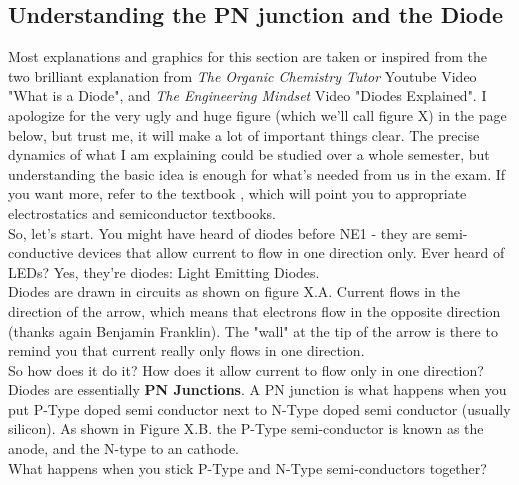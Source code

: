 \subsection{Understanding the PN junction and the Diode}

Most explanations and graphics for this section are taken or inspired from the two brilliant explanation from \emph{The Organic Chemistry Tutor} Youtube Video "What is a Diode", and \emph{The Engineering Mindset} Video "Diodes Explained". I apologize for the very ugly and huge figure (which we'll call figure X) in the page below, but trust me, it will make a lot of important things clear. The precise dynamics of what I am explaining could be studied over a whole semester, but understanding the basic idea is enough for what's needed from us in the exam. If you want more, refer to the textbook \cite{liu2002analog}, which will point you to appropriate electrostatics and semiconductor textbooks. \\

So, let's start. You might have heard of diodes before NE1 - they are semi-conductive devices that allow current to flow in one direction only. Ever heard of LEDs? Yes, they're diodes: Light Emitting Diodes. \\

Diodes are drawn in circuits as shown on figure X.A. Current flows in the direction of the arrow, which means that electrons flow in the opposite direction (thanks again Benjamin Franklin). The "wall" at the tip of the arrow is there to remind you that current really only flows in one direction.   \\

So how does it do it? How does it allow current to flow only in one direction? \\

Diodes are essentially \textbf{PN Junctions}. A PN junction is what happens when you put P-Type doped semi conductor next to N-Type doped semi conductor (usually silicon). As shown in Figure X.B. the P-Type semi-conductor is known as the anode, and the N-type to an cathode. \\

What happens when you stick P-Type and N-Type semi-conductors together? \\

